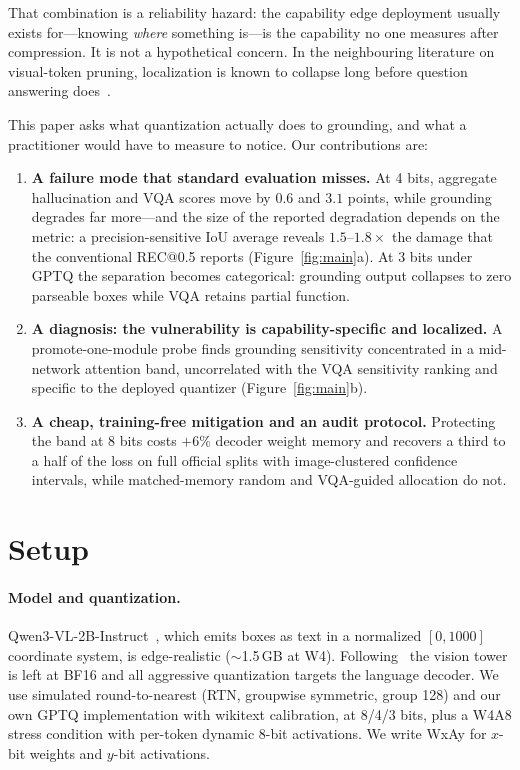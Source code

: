 \documentclass[letterpaper]{article} %
\begin{document}
That combination is a reliability hazard: the capability edge deployment usually exists for---knowing \emph{where} something is---is the capability no one measures after compression. It is not a hypothetical concern. In the neighbouring literature on visual-token pruning, localization is known to collapse long before question answering does~\cite{feather,nuwa}.

This paper asks what quantization actually does to grounding, and what a practitioner would have to measure to notice. Our contributions are:

\begin{enumerate}
\item \textbf{A failure mode that standard evaluation misses.} At 4 bits, aggregate hallucination and VQA scores move by $0.6$ and $3.1$ points, while grounding degrades far more---and the size of the reported degradation depends on the metric: a precision-sensitive IoU average reveals $1.5$--$1.8\times$ the damage that the conventional REC@0.5 reports (Figure~\ref{fig:main}a). At 3 bits under GPTQ the separation becomes categorical: grounding output collapses to zero parseable boxes while VQA retains partial function.
\item \textbf{A diagnosis: the vulnerability is capability-specific and localized.} A promote-one-module probe finds grounding sensitivity concentrated in a mid-network attention band, uncorrelated with the VQA sensitivity ranking and specific to the deployed quantizer (Figure~\ref{fig:main}b).
\item \textbf{A cheap, training-free mitigation and an audit protocol.} Protecting the band at 8 bits costs $+6\%$ decoder weight memory and recovers a third to a half of the loss on full official splits with image-clustered confidence intervals, while matched-memory random and VQA-guided allocation do not.
\end{enumerate}

\section{Setup}

\paragraph{Model and quantization.} Qwen3-VL-2B-Instruct~\cite{qwen3vl}, which emits boxes as text in a normalized $[0,1000]$ coordinate system, is edge-realistic ($\sim$1.5\,GB at W4). Following~\cite{rethinkingsmall} the vision tower is left at BF16 and all aggressive quantization targets the language decoder. We use simulated round-to-nearest (RTN, groupwise symmetric, group 128) and our own GPTQ implementation with wikitext calibration, at 8/4/3 bits, plus a W4A8 stress condition with per-token dynamic 8-bit activations. We write WxAy for $x$-bit weights and $y$-bit activations.
\end{document}
